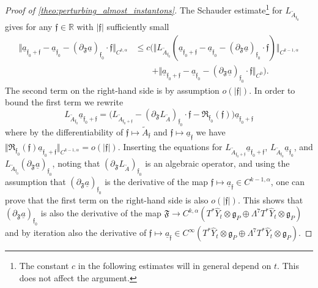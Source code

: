 \documentclass[11pt,a4paper]{scrartcl}
\newcommand{\VertC}[2]{\Vert_{C^{{#1}}{#2}}}
\newcommand{\VertH}[2]{\Vert_{C^{{#1},\alpha}{#2}}}
\numberwithin{equation}{section}
\theoremstyle{plain}
\theoremstyle{definition}
\theoremstyle{remark}
\begin{document}
\begin{proof}[Proof of \autoref{theo:perturbing_almost_instantons}]
The Schauder estimate\footnote{The constant $c$ in the following estimates will in general depend on $t$. This does not affect the argument.} for $L_{\tilde{A}_{\mathfrak{f}_0}}$ gives for any $\mathfrak{f}\in \mathbb{R}$ with $\vert \mathfrak{f} \vert $ sufficiently small
\begin{align*}
\Vert \underline{a}_{\mathfrak{f}_0+\mathfrak{f}} - \underline{a}_{\mathfrak{f}_0} - (\partial_\mathfrak{F}\underline{a})_{\mathfrak{f}_0} \cdot \mathfrak{f} \VertH{k}{} &\leq c \big( \Vert L_{\tilde{A}_{\mathfrak{f}_0}} (\underline{a}_{\mathfrak{f}_0+\mathfrak{f}} - \underline{a}_{\mathfrak{f}_0} - (\partial_\mathfrak{F}\underline{a})_{\mathfrak{f}_0} \cdot \mathfrak{f} ) \VertH{k-1}{} \\
& \qquad + \Vert \underline{a}_{\mathfrak{f}_0+\mathfrak{f}} - \underline{a}_{\mathfrak{f}_0} - (\partial_\mathfrak{F}\underline{a})_{\mathfrak{f}_0} \cdot \mathfrak{f}  \VertC{0}{} \big).
\end{align*}
The second term on the right-hand side is by assumption $o(\vert \mathfrak{f} \vert)$. In order to bound the first term we rewrite \[ L_{\tilde{A}_{\mathfrak{f}_0}} \underline{a}_{\mathfrak{f}_0+\mathfrak{f}} = \big(L_{\tilde{A}_{\mathfrak{f}_0+\mathfrak{f}}} - (\partial_\mathfrak{F}L_{\tilde{A}})_{\mathfrak{f}_0} \cdot \mathfrak{f} - \mathfrak{R}_{\mathfrak{f}_0}(\mathfrak{f})\big) \underline{a}_{\mathfrak{f}_0+\mathfrak{f}} \] where by the differentiability of $\mathfrak{f}\mapsto \tilde{A}_{\mathfrak{f}}$ and $\mathfrak{f}\mapsto \underline{a}_\mathfrak{f}$ we have $\Vert \mathfrak{R}_{\mathfrak{f}_0}(\mathfrak{f}) \underline{a}_{\mathfrak{f}_0+\mathfrak{f}} \VertH{k-1}{} = o(\vert \mathfrak{f} \vert)$. Inserting the equations for $L_{\tilde{A}_{\mathfrak{f}_0+\mathfrak{f}}}\underline{a}_{\mathfrak{f}_0+\mathfrak{f}}$, $L_{\tilde{A}_{\mathfrak{f}_0}}\underline{a}_{\mathfrak{f}_0}$, and $L_{\tilde{A}_{\mathfrak{f}_0}} (\partial_\mathfrak{F}\underline{a})_{\mathfrak{f}_0}$, noting that $(\partial_\mathfrak{F}L_{\tilde{A}})_{\mathfrak{f}_0}$ is an algebraic operator, and using the assumption that $(\partial_{\mathfrak{F}}\underline{a})_{\mathfrak{f}_0}$ is the derivative of the map $\mathfrak{f}\mapsto \underline{a}_\mathfrak{f}\in C^{k-1,\alpha}$, one can prove that the first term on the right-hand side is also $o(\vert \mathfrak{f} \vert)$. This shows that $(\partial_\mathfrak{F}\underline{a})_{\mathfrak{f}_0}$ is also the derivative of the map $\mathfrak{F} \to C^{k,\alpha}(T^*\hat{Y}_t \otimes \mathfrak{g}_P \oplus \Lambda^7 T^*\hat{Y}_t \otimes \mathfrak{g}_P)$ and by iteration also the derivative of $\mathfrak{f} \mapsto \underline{a}_\mathfrak{f}\in C^{\infty}(T^*\hat{Y}_t \otimes \mathfrak{g}_P \oplus \Lambda^7 T^*\hat{Y}_t \otimes \mathfrak{g}_P)$.


\end{proof}
\end{document}
